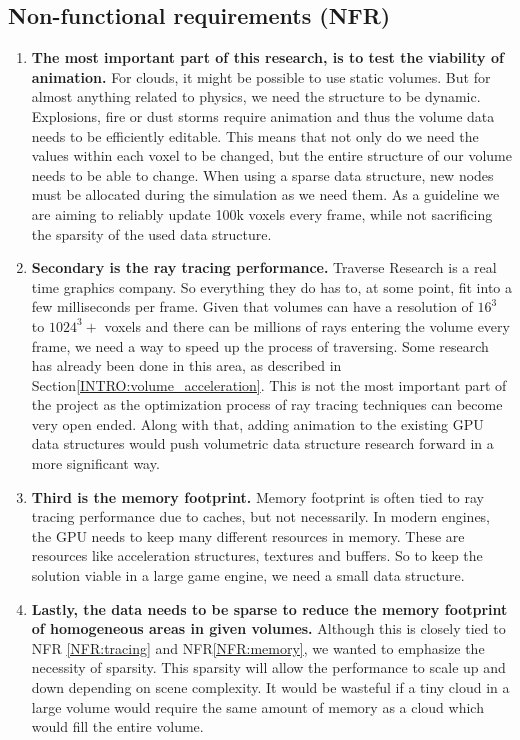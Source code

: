 \subsection{Non-functional requirements (NFR)}\label{REQUIREMENTS:NFR}
\begin{enumerate}
    \item \textbf{The most important part of this research, is to test the viability of animation.} For clouds, it might be possible to use static volumes. But for almost anything related to physics, we need the structure to be dynamic. Explosions, fire or dust storms require animation and thus the volume data needs to be efficiently editable. This means that not only do we need the values within each voxel to be changed, but the entire structure of our volume needs to be able to change. When using a sparse data structure, new nodes must be allocated during the simulation as we need them. As a guideline we are aiming to reliably update 100k voxels every frame, while not sacrificing the sparsity of the used data structure.\label{NFR:update}
    \item \textbf{Secondary is the ray tracing performance.} Traverse Research is a real time graphics company. So everything they do has to, at some point, fit into a few milliseconds per frame. Given that volumes can have a resolution of $16^3$ to $1024^3+$ voxels and there can be millions of rays entering the volume every frame, we need a way to speed up the process of traversing. Some research has already been done in this area, as described in Section\ref{INTRO:volume_acceleration}. This is not the most important part of the project as the optimization process of ray tracing techniques can become very open ended. Along with that, adding animation to the existing GPU data structures would push volumetric data structure research forward in a more significant way. \label{NFR:tracing}
    \item \textbf{Third is the memory footprint.} Memory footprint is often tied to ray tracing performance due to caches, but not necessarily. In modern engines, the GPU needs to keep many different resources in memory. These are resources like acceleration structures, textures and buffers. So to keep the solution viable in a large game engine, we need a small data structure. \label{NFR:memory}
    \item \textbf{Lastly, the data needs to be sparse to reduce the memory footprint of homogeneous areas in given volumes.} Although this is closely tied to NFR \ref{NFR:tracing} and NFR\ref{NFR:memory}, we wanted to emphasize the necessity of sparsity. This sparsity will allow the performance to scale up and down depending on scene complexity. It would be wasteful if a tiny cloud in a large volume would require the same amount of memory as a cloud which would fill the entire volume. \label{NFR:sparsity}
\end{enumerate}


